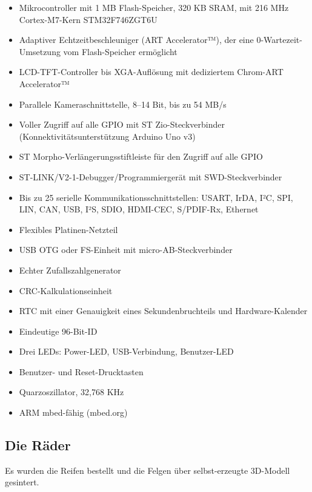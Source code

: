 \begin{itemize}
	\item Mikrocontroller mit 1 MB Flash-Speicher, 320 KB SRAM, mit 216 MHz Cortex-M7-Kern STM32F746ZGT6U
	\item Adaptiver Echtzeitbeschleuniger (ART Accelerator™), der eine 0-Wartezeit-Umsetzung vom Flash-Speicher ermöglicht
	\item LCD-TFT-Controller bis XGA-Auflösung mit dediziertem Chrom-ART Accelerator™
	\item Parallele Kameraschnittstelle, 8–14 Bit, bis zu 54 MB/s
	\item Voller Zugriff auf alle GPIO mit ST Zio-Steckverbinder (Konnektivitätsunterstützung Arduino Uno v3)
	\item ST Morpho-Verlängerungsstiftleiste für den Zugriff auf alle GPIO
	\item ST-LINK/V2-1-Debugger/Programmiergerät mit SWD-Steckverbinder
	\item Bis zu 25 serielle Kommunikationsschnittstellen: USART, IrDA, I²C, SPI, LIN, CAN, USB, I²S, SDIO, HDMI-CEC, S/PDIF-Rx, Ethernet
	\item Flexibles Platinen-Netzteil
	\item USB OTG oder FS-Einheit mit micro-AB-Steckverbinder
	\item Echter Zufallszahlgenerator
	\item CRC-Kalkulationseinheit
	\item RTC mit einer Genauigkeit eines Sekundenbruchteils und Hardware-Kalender
	\item Eindeutige 96-Bit-ID
	\item Drei LEDs: Power-LED, USB-Verbindung, Benutzer-LED
	\item Benutzer- und Reset-Drucktasten
	\item Quarzoszillator, 32,768 KHz
	\item ARM mbed-fähig (mbed.org)

\end{itemize}


\subsection{Die Räder}

Es wurden die Reifen bestellt und die Felgen über selbst-erzeugte 3D-Modell gesintert.

